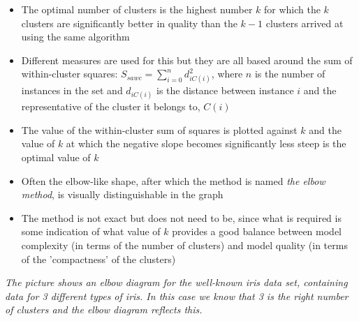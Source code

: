 \begin{itemize}
  
\item The optimal number of clusters is the highest number $k$ for which the $k$ clusters are significantly better in quality than the $k-1$ clusters arrived at using the same algorithm
  
\item Different measures are used for this but they are all based around the sum of within-cluster squares: $ S_{sawc} = \sum_{i=0}^n d_{iC(i)}^2 $, where $n$ is the number of instances in the set and $d_{iC(i)}$ is the distance between instance $i$ and the representative of the cluster it belongs to, $C(i)$
  
\end{itemize}
\parbox[b][0.25\textwidth][t]{0.95\textwidth - \elbowpngwidth}{
\begin{itemize}
\item The value of the  within-cluster sum of squares is plotted against $k$ and the value of $k$ at which the negative slope becomes significantly less steep is the optimal value of $k$
\item Often the elbow-like shape, after which the method is named \emph{the elbow method}, is visually distinguishable in the graph
\item The method is not exact but does not need to be, since what is required is some indication of what value of $k$ provides a good balance between model complexity (in terms of the number of clusters) and model quality (in terms of the 'compactness' of the clusters)
\end{itemize}}


\parbox[t]{\elbowpngwidth}{
\tiny \emph{The picture shows an elbow diagram for the well-known iris data set, containing data for 3 different types of iris. In  this case we know that 3 is the right number of clusters and the elbow diagram reflects this.}}


\newpage
  

